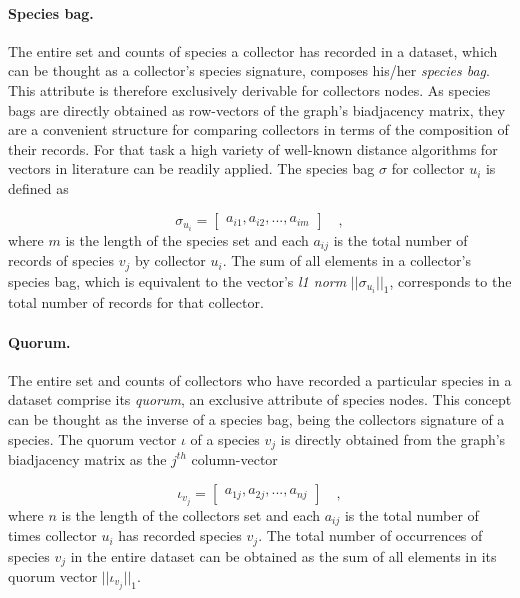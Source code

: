 \paragraph{Species bag.} 
The entire set and counts of species a collector has recorded in a dataset, which can be thought as a collector's species signature, composes his/her \textit{species bag}. This attribute is therefore exclusively derivable for collectors nodes.
As species bags are directly obtained as row-vectors of the graph's biadjacency matrix, they are a convenient structure for comparing collectors in terms of the composition of their records.
For that task a high variety of well-known distance algorithms for vectors in literature can be readily applied.
The species bag $\sigma$ for collector $u_i$ is defined as

$$
\sigma_{u_i} =  \begin{bmatrix}
a_{i 1}, a_{i 2}, ..., a_{i m}
\end{bmatrix}  \quad ,
$$
where $m$ is the length of the species set and each $a_{i j}$ is the total number of records of species $v_j$ by collector $u_i$. The sum of all elements in a collector's species bag, which is equivalent to the vector's \textit{l1 norm} $||\sigma_{u_i}||_1$, corresponds to the total number of records for that collector.

 
\paragraph{Quorum.} 
The entire set and counts of collectors who have recorded a particular species in a dataset comprise its \textit{quorum}, an exclusive attribute of species nodes. 
This concept can be thought as the inverse of a species bag, being the collectors signature of a species. 
The quorum vector $\iota$ of a species $v_j$ is directly obtained from the graph's biadjacency matrix as the $j^{th}$ column-vector 

$$
\iota_{v_j} = \begin{bmatrix}
a_{1 j}, a_{2 j}, ..., a_{n j}
\end{bmatrix} \quad ,
$$
where $n$ is the length of the collectors set and each $a_{i j}$ is the total number of times collector $u_i$ has recorded species $v_j$. 
The total number of occurrences of species $v_j$ in the entire dataset can be obtained as the sum of all elements in its quorum vector $ || \iota_{v_j} ||_1$.


